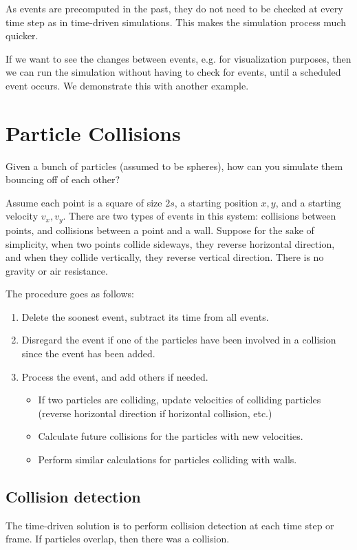 \documentclass{article}
\begin{document}
As events are precomputed in the past, they do not need to be checked at every time step as in time-driven simulations.  This makes the simulation process much quicker.

If we want to see the changes between events, e.g. for visualization purposes, then we can run the simulation without having to check for events, until a scheduled event occurs.  We demonstrate this with another example.

\section{Particle Collisions}
Given a bunch of particles (assumed to be spheres), how can you simulate them bouncing off of each other?

Assume each point is a square of size $2s$, a starting position $x,y$, and a starting velocity $v_x, v_y$.  There are two types of events in this system: collisions between points, and collisions between a point and a wall.  Suppose for the sake of simplicity, when two points collide sideways, they reverse horizontal direction, and when they collide vertically, they reverse vertical direction.  There is no gravity or air resistance.

The procedure goes as follows:

\begin{enumerate}
\item Delete the soonest event, subtract its time from all events.
\item Disregard the event if one of the particles have been involved in a collision since the event has been added.
\item Process the event, and add others if needed.
\begin{itemize}
\item If two particles are colliding, update velocities of colliding particles (reverse horizontal direction if horizontal collision, etc.)
\item Calculate future collisions for the particles with new velocities.
\item Perform similar calculations for particles colliding with walls.
\end{itemize}
\end{enumerate}

\subsection{Collision detection}
The time-driven solution is to perform collision detection at each time step or frame.  If particles overlap, then there was a collision.
\end{document}
